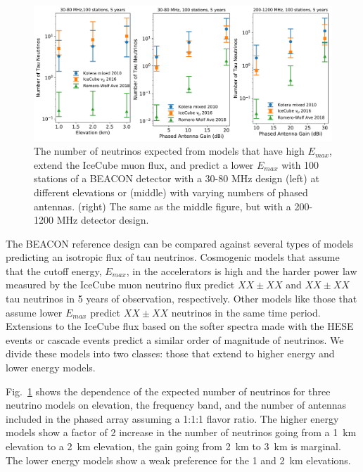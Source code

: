\documentclass{PoS}
\begin{document}
\begin{figure}[htbp]
\begin{center}
\includegraphics[width=\textwidth]{figures/beacon_5years_100stations_variations}
\caption{The number of neutrinos expected from models that have high $E_{max}$, extend the IceCube muon flux, and predict a lower $E_{max}$ with 100 stations of a BEACON detector with a 30-80 MHz design (left) at different elevations or (middle) with varying numbers of phased antennas. (right) The same as the middle figure, but with a 200-1200 MHz detector design.}
\label{fig:number_nus}
\end{center}
\end{figure}

The BEACON reference design can be compared against several types of models predicting an isotropic flux of tau neutrinos. Cosmogenic models that assume that the cutoff energy, $E_{max}$, in the accelerators is high and the harder power law measured by the IceCube muon neutrino flux predict $XX \pm XX$ and $XX \pm XX$ tau neutrinos in 5 years of observation, respectively. Other models like those that assume lower $E_{max}$ predict $XX \pm XX$ neutrinos in the same time period. Extensions to the IceCube flux based on the softer spectra made with the HESE events or cascade events predict a similar order of magnitude of neutrinos. We divide these models into two classes: those that extend to higher energy and lower energy models.

Fig.~\ref{fig:number_nus} shows the dependence of the expected number of neutrinos for three neutrino models on elevation, the frequency band, and the number of antennas included in the phased array assuming a 1:1:1 flavor ratio. The higher energy models show a factor of 2 increase in the number of neutrinos going from a 1~km elevation to a 2~km elevation, the gain going from 2~km to 3~km is marginal. The lower energy models show a weak preference for the 1 and 2~km elevations. 
\end{document}
